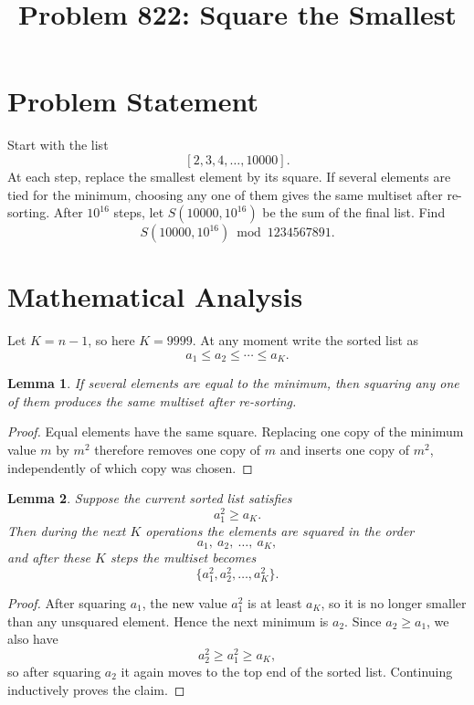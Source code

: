 \documentclass[11pt]{article}
\title{Problem 822: Square the Smallest}
\author{}
\date{}
\newtheorem{lemma}{Lemma}
\begin{document}
\maketitle

\section{Problem Statement}

Start with the list
\[
[2,3,4,\dots,10000].
\]
At each step, replace the smallest element by its square. If several elements are tied for the minimum, choosing any one of them gives the same multiset after re-sorting. After $10^{16}$ steps, let $S(10000,10^{16})$ be the sum of the final list. Find
\[
S(10000,10^{16}) \bmod 1234567891.
\]

\section{Mathematical Analysis}

Let $K=n-1$, so here $K=9999$. At any moment write the sorted list as
\[
a_1 \le a_2 \le \cdots \le a_K.
\]

\begin{lemma}
If several elements are equal to the minimum, then squaring any one of them produces the same multiset after re-sorting.
\end{lemma}

\begin{proof}
Equal elements have the same square. Replacing one copy of the minimum value $m$ by $m^2$ therefore removes one copy of $m$ and inserts one copy of $m^2$, independently of which copy was chosen.
\end{proof}

\begin{lemma}
Suppose the current sorted list satisfies
\[
a_1^2 \ge a_K.
\]
Then during the next $K$ operations the elements are squared in the order
\[
a_1,\ a_2,\ \dots,\ a_K,
\]
and after these $K$ steps the multiset becomes
\[
\{a_1^2,a_2^2,\dots,a_K^2\}.
\]
\end{lemma}

\begin{proof}
After squaring $a_1$, the new value $a_1^2$ is at least $a_K$, so it is no longer smaller than any unsquared element. Hence the next minimum is $a_2$. Since $a_2 \ge a_1$, we also have
\[
a_2^2 \ge a_1^2 \ge a_K,
\]
so after squaring $a_2$ it again moves to the top end of the sorted list. Continuing inductively proves the claim.
\end{proof}
\end{document}
